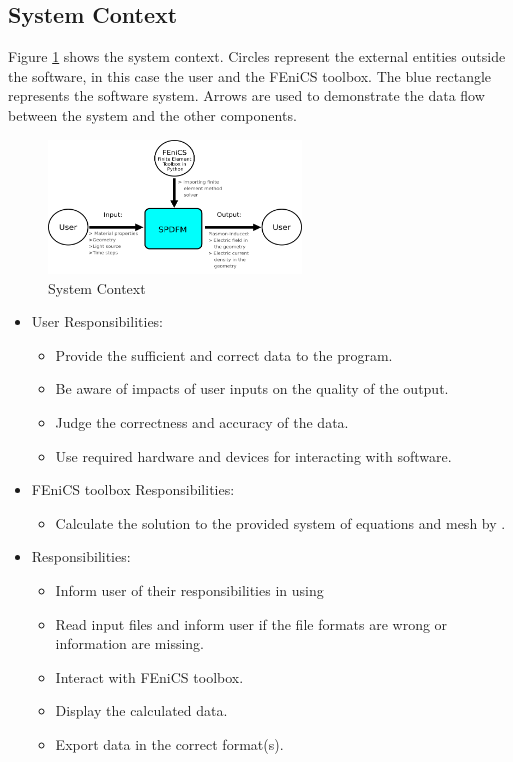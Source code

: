 \documentclass[12pt]{article}
\begin{document}
	\subsection{System Context}
	
	Figure \ref{Fig_SystemContext} shows the system context. Circles represent the
	external entities outside the software, in this case the user and the FEniCS
	toolbox. The blue rectangle represents the \progname software system. Arrows are
	used to demonstrate the data flow between the system and the other components.
	\begin{figure}[h!] \begin{center}
			\includegraphics[width=0.6\textwidth]{SystemContextFigure.png} \caption{System
				Context} \label{Fig_SystemContext} \end{center} \end{figure}
	
	
	\begin{itemize} \item User Responsibilities: \begin{itemize} \item Provide the
			sufficient and correct data to the program. \item Be aware of impacts of user
			inputs on the quality of the output. \item Judge the correctness and accuracy of
			the data. \item Use required hardware and devices for interacting with software.
		\end{itemize}
		
		\item FEniCS toolbox Responsibilities: \begin{itemize} \item Calculate the
			solution to the provided system of equations and mesh by \progname{}.
		\end{itemize}
		
		
		\item \progname{} Responsibilities: \begin{itemize} \item Inform user of their
			responsibilities in using \progname{} \item Read input files and inform user if
			the file formats are wrong or information are missing. \item Interact with
			FEniCS toolbox. \item Display the calculated data. \item Export data in the
			correct format(s). \end{itemize} \end{itemize}
	
\end{document}
